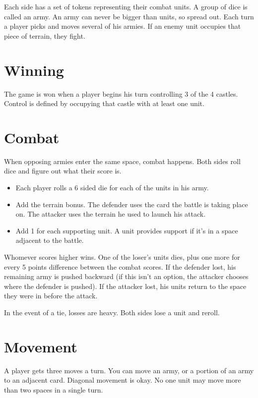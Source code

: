 \documentclass{article}
\begin{document}
Each side has a set of \reinforcements tokens representing their combat units.  A group of dice is called an army.  An army can never be bigger than \maxarmy units, so spread out.  Each turn a player picks and moves several of his armies.  If an enemy unit occupies that piece of terrain, they fight.

\section{Winning}

The game is won when a player begins his turn controlling 3 of the 4 castles.  Control is defined by occupying that castle with at least one unit.

\section{Combat}

When opposing armies enter the same space, combat happens.  Both sides roll dice and figure out what their score is.  

\begin{itemize}
  \item Each player rolls a 6 sided die for each of the units in his army.  
  \item Add the terrain bonus.  The defender uses the card the battle is taking place on.  The attacker uses the terrain he used to launch his attack.
  \item Add 1 for each supporting unit.  A unit provides support if it's in a space adjacent to the battle. 
\end{itemize}

Whomever scores higher wins.  One of the loser's units dies, plus one more for every 5 points difference between the combat scores.  If the defender lost, his remaining army is pushed backward (if this isn't an option, the attacker chooses where the defender is pushed).  If the attacker lost, his units return to the space they were in before the attack.

In the event of a tie, losses are heavy.  Both sides lose a unit and reroll.

\section{Movement}

A player gets three moves a turn.  You can move an army, or a portion of an army to an adjacent card.  Diagonal movement is okay.  No one unit may move more than two spaces in a single turn.
\end{document}
